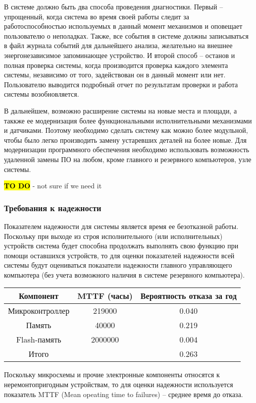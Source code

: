 \documentclass[a4paper, 12pt, titlepage]{article}
\begin{document}
В системе должно быть два способа проведения диагностики. Первый -- упрощенный, когда система во время своей работы 
следит за работоспособностью используемых в данный момент механизмов и оповещает пользователю о неполадках. 
Также, все события в системе должны записываться в файл журнала событий для дальнейшего анализа, желательно на внешнее 
энергонезависимое запоминающее устройство. 
И второй способ -- останов и полная проверка системы, когда производится проверка каждого элемента системы, независимо от того, 
задействован он в данный момент или нет. Пользователю выводится подробный отчет по результатам проверки и работа системы 
возобновляется.

В дальнейшем, возможно расширение системы на новые места и площади, а таккже ее модернизация более функциональными 
исполнительными механизмами и датчиками. Поэтому необходимо сделать систему как можно более модульной, чтобы было легко 
производить замену устаревших деталей на более новые. Для модернизации программного обеспечения необходимо использовать 
возможность удаленной замены ПО на любом, кроме главного и резервного компьютеров, узле системы.

\hl{\bf TO DO} - not sure if we need it
\subsubsection{Требования к надежности}

Показателем надежности для системы является время ее безотказной работы. Поскольку при выходе из строя 
исполнительного (или исполнительных) устройств система будет способна продолжать выполнять свою функцию 
при помощи оставшихся устройств, то для оценки показателей надежности всей системы будут оцениваться 
показатели надежности главного управляющего компьютера (без учета возможного наличия в системе резервного 
компьютера).

\begin{tabular}{|c|c|c|}
\hline
\textbf{Компонент} & \textbf{MTTF (часы)} & \textbf{Вероятность отказа за год} \\
\hline
Микроконтроллер & 219000 & 0.040 \\
\hline
Память & 40000 & 0.219 \\
\hline
Flash-память & 2000000 & 0.004 \\
\hline
Итого & {} & 0.263 \\
\hline
\end{tabular}

Поскольку микросхемы и прочие электронные компоненты относятся к неремонтопригодным устройствам, то для 
оценки надежности используется показатель MTTF (Mean opeating time to failures) -- среднее время до отказа.
\end{document}
